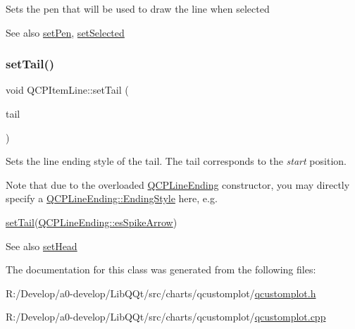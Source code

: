 Sets the pen that will be used to draw the line when selected

\begin{DoxySeeAlso}{See also}
\mbox{\hyperlink{class_q_c_p_item_line_a572528dab61c1abe205822fbd5db4b27}{set\+Pen}}, \mbox{\hyperlink{class_q_c_p_abstract_item_a203de94ad586cc44d16c9565f49d3378}{set\+Selected}} 
\end{DoxySeeAlso}
\mbox{\label{class_q_c_p_item_line_ac264222c3297a7efe33df9345c811a5f}} 
\subsubsection{\texorpdfstring{set\+Tail()}{setTail()}}
{\footnotesize\ttfamily void Q\+C\+P\+Item\+Line\+::set\+Tail (\begin{DoxyParamCaption}\item[{const \mbox{\hyperlink{class_q_c_p_line_ending}{Q\+C\+P\+Line\+Ending}} \&}]{tail }\end{DoxyParamCaption})}

Sets the line ending style of the tail. The tail corresponds to the {\itshape start} position.

Note that due to the overloaded \mbox{\hyperlink{class_q_c_p_line_ending}{Q\+C\+P\+Line\+Ending}} constructor, you may directly specify a \mbox{\hyperlink{class_q_c_p_line_ending_a5ef16e6876b4b74959c7261d8d4c2cd5}{Q\+C\+P\+Line\+Ending\+::\+Ending\+Style}} here, e.\+g.
\begin{DoxyCode}
\mbox{\hyperlink{class_q_c_p_item_line_ac264222c3297a7efe33df9345c811a5f}{setTail}}(\mbox{\hyperlink{class_q_c_p_line_ending_a5ef16e6876b4b74959c7261d8d4c2cd5ab9964d0d03f812d1e79de15edbeb2cbf}{QCPLineEnding::esSpikeArrow}}) 
\end{DoxyCode}


\begin{DoxySeeAlso}{See also}
\mbox{\hyperlink{class_q_c_p_item_line_aebf3d687114d584e0459db6759e2c3c3}{set\+Head}} 
\end{DoxySeeAlso}


The documentation for this class was generated from the following files\+:\begin{DoxyCompactItemize}
\item 
R\+:/\+Develop/a0-\/develop/\+Lib\+Q\+Qt/src/charts/qcustomplot/\mbox{\hyperlink{qcustomplot_8h}{qcustomplot.\+h}}\item 
R\+:/\+Develop/a0-\/develop/\+Lib\+Q\+Qt/src/charts/qcustomplot/\mbox{\hyperlink{qcustomplot_8cpp}{qcustomplot.\+cpp}}\end{DoxyCompactItemize}
